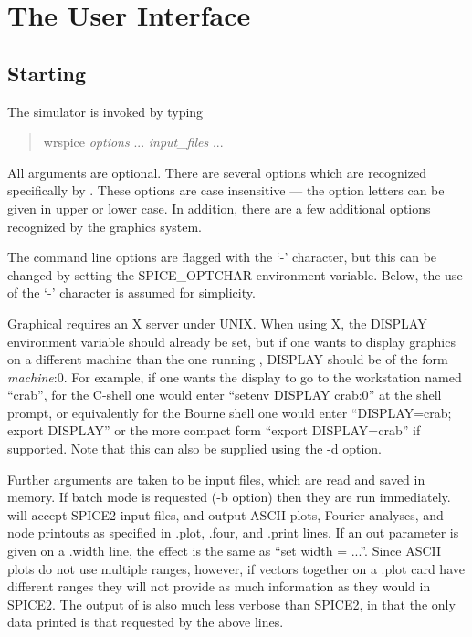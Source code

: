 \chapter{The {\WRspice} User Interface}

\section{Starting {\WRspice}}


The {\WRspice} simulator is invoked by typing
\begin{quote}
{\vt wrspice} {\it options} ... {\it input\_files} ...
\end{quote}
All arguments are optional.  There are several options which are
recognized specifically by {\WRspice}.  These options are case
insensitive --- the option letters can be given in upper or lower
case.  In addition, there are a few additional options recognized by
the graphics system.

The command line options are flagged with the `{\vt -}' character, but
this can be changed by setting the {\et SPICE\_OPTCHAR} environment variable. 
Below, the use of the `{\vt -}' character is assumed for simplicity. 

Graphical {\WRspice} requires an X server under UNIX.  When using X,
the {\et DISPLAY} environment variable should already be set, but if
one wants to display graphics on a different machine than the one
running {\WRspice}, {\et DISPLAY} should be of the form {\it
machine\/}:0.  For example, if one wants the display to go to the
workstation named ``{\vt crab}'', for the C-shell one would enter
``{\vt setenv DISPLAY crab:0}'' at the shell prompt, or equivalently
for the Bourne shell one would enter ``{\vt DISPLAY=crab; export
DISPLAY}'' or the more compact form ``{\vt export DISPLAY=crab}'' if
supported.  Note that this can also be supplied using the {\vt -d}
option.

Further arguments are taken to be {\WRspice} input files, which are
read and saved in memory.  If batch mode is requested ({\vt -b}
option) then they are run immediately.  {\WRspice} will accept SPICE2
input files, and output ASCII plots, Fourier analyses, and node
printouts as specified in {\vt .plot}, {\vt .four}, and {\vt .print}
lines.  If an {\vt out} parameter is given on a {\vt .width} line, the
effect is the same as ``{\vt set width = ...}''.  Since {\WRspice}
ASCII plots do not use multiple ranges, however, if vectors together
on a {\vt .plot} card have different ranges they will not provide as
much information as they would in SPICE2.  The output of {\WRspice} is
also much less verbose than SPICE2, in that the only data printed is
that requested by the above lines.

